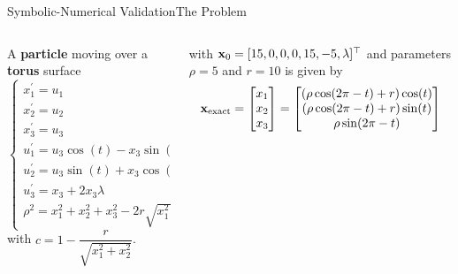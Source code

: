 \begin{frame}{Symbolic-Numerical Validation}{The Problem}
  \begin{columns}
    \begin{column}[t]{0.425\textwidth}
      A \textbf{particle} moving over a \textbf{torus} surface%
      \begin{equation*}
        \label{chap4:eq:torus}
        \begin{cases}
          x^{\prime}_{1} = u_{1} \\
          x^{\prime}_{2} = u_{2} \\
          x^{\prime}_{3} = u_{3} \\
          u^{\prime}_{1} = u_{3}\cos(t) - x_{3}\sin(t) - u_{2} + 2 c x_{1}\lambda \\
          u^{\prime}_{2} = u_{3}\sin(t) + x_{3}\cos(t) + u_{1} + 2 c x_{2}\lambda \\
          u^{\prime}_{3} = x_{3} + 2x_{3}\lambda \\[-0.1em]
          \rho^2 = x_{1}^2 + x_{2}^2 + x_{3}^2 - 2r\sqrt{x_{1}^2 + x_{2}^2} + r^2
        \end{cases}
      \end{equation*}
      with $c = 1 - \dfrac{r}{\sqrt{x_{1}^2 + x_{2}^2}}$.
    \end{column}
    \begin{column}[t]{0.575\textwidth}
      \vspace{-4.0em}
      with $\mathbf{x}_{0} = [15, 0, 0, 0, 15, -5, \lambda]^{\top}$ and parameters $\rho = 5$ and $r = 10$ is given by
      \begin{equation*}
        \mathbf{x}_\text{exact} = \begin{bmatrix}
          x_{1} \\ x_{2} \\ x_{3}
        \end{bmatrix} = \begin{bmatrix}
          (\rho \cos(2\pi - t) + r) \cos(t) \\
          (\rho \cos(2\pi - t) + r) \sin(t) \\
          \rho \sin(2\pi - t)
        \end{bmatrix}
      \end{equation*} \\[-3.0em]
      \centering{
      \begin{tikzpicture}
        \begin{axis}[
          xtick=\empty, ytick=\empty, ztick=\empty,
          axis line style={draw=none},
          tick style={draw=none},
          axis equal,
          view={100}{40}]

\end{axis}
\end{tikzpicture}}
\end{column}
\end{columns}
\end{frame}
